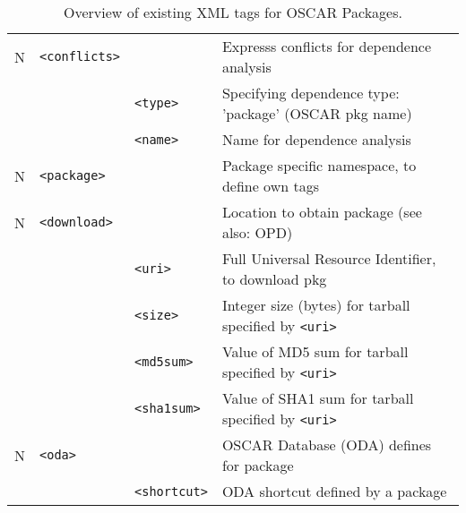 \begin{table}[h!]
\begin{small}
\begin{center}
\begin{tabular}{|c|l|l|l|}
  N & \verb|<conflicts>|
  		&   
		& Expresss conflicts for dependence analysis
		\\\cline{3-4}
%
    & 
		& \verb|<type>|    
		& Specifying dependence type: 'package'  (OSCAR pkg name)
		\\\cline{3-4}
%
	&
		& \verb|<name>|
		& Name for dependence analysis
		\\\hline

  N & \verb|<package>| 
		&    
		& Package specific namespace, to define own tags
		\\\hline

  N & \verb|<download>| 
		&    
		& Location to obtain package (see also: OPD)
		\\\cline{3-4}
%
    & 
		& \verb|<uri>|   
		& Full Universal Resource Identifier, to download pkg
		\\\cline{3-4}
%
    & 
		& \verb|<size>|   
		& Integer size (bytes) for tarball specified by \verb|<uri>|
		\\\cline{3-4}
%
    & 
		& \verb|<md5sum>|   
		& Value of MD5 sum for tarball specified by \verb|<uri>|
		\\\cline{3-4}
%
    & 
		& \verb|<sha1sum>|   
		& Value of SHA1 sum for tarball specified by \verb|<uri>|
		\\\hline

  N & \verb|<oda>|     
		&    
		& OSCAR Database (ODA) defines for package     
		\\\cline{3-4}
%
    & 
		& \verb|<shortcut>|   
		& ODA shortcut defined by a package            
		\\\hline


  \end{tabular}
  \end{center}  
\end{small}
  \caption[OSCAR Package XML tags]{Overview of existing XML tags for OSCAR
  Packages.}  
  \label{tab:pkg-xml-tags}
\end{table}
